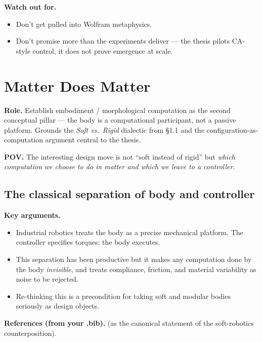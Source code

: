 \textbf{Watch out for.}
\begin{itemize}
    \item Don't get pulled into Wolfram metaphysics.
    \item Don't promise more than the experiments deliver — the
          thesis pilots CA-style control, it does not prove emergence
          at scale.
\end{itemize}

\section{Matter Does Matter}
\label{sec:matter-does-matter}

\textbf{Role.} Establish embodiment / morphological computation
as the second conceptual pillar — the body is a computational
participant, not a passive platform. Grounds the
\emph{Soft vs.\ Rigid} dialectic from \S1.1 and the
configuration-as-computation argument central to the thesis.

\textbf{POV.} The interesting design move is not ``soft instead of
rigid'' but \emph{which computation we choose to do in matter and
which we leave to a controller}.

\subsection{The classical separation of body and controller}
\label{subsec:classical-separation}

\textbf{Key arguments.}
\begin{itemize}
    \item Industrial robotics treats the body as a precise mechanical
          platform. The controller specifies torques; the body executes.
    \item This separation has been productive but it makes any
          computation done by the body \emph{invisible}, and treats
          compliance, friction, and material variability as noise to
          be rejected.
    \item Re-thinking this is a precondition for taking soft and
          modular bodies seriously as design objects.
\end{itemize}

\textbf{References (from your .bib).}
\cite{rusDesignFabricationControl2015} (as the canonical statement
of the soft-robotics counterposition).

